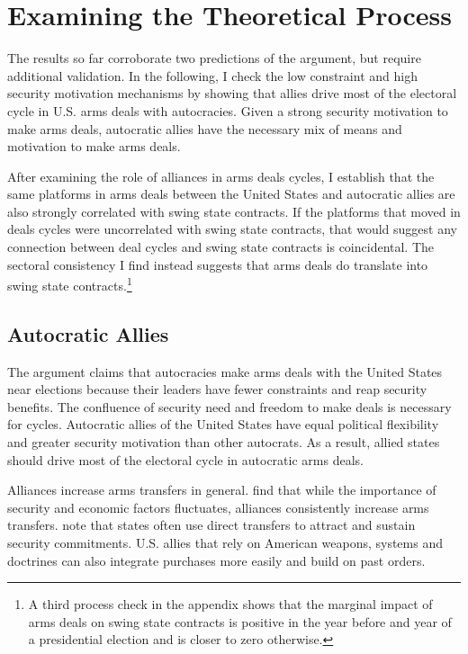 \documentclass[12pt]{article}
\begin{document}
\section{Examining the Theoretical Process}


The results so far corroborate two predictions of the argument, but require additional validation. 
In the following, I check the low constraint and high security motivation mechanisms by showing that allies drive most of the electoral cycle in U.S. arms deals with autocracies.  
Given a strong security motivation to make arms deals, autocratic allies have the necessary mix of means and motivation to make arms deals.


After examining the role of alliances in arms deals cycles, I establish that the same platforms in arms deals between the United States and autocratic allies are also strongly correlated with swing state contracts.
If the platforms that moved in deals cycles were uncorrelated with swing state contracts, that would suggest any connection between deal cycles and swing state contracts is coincidental.
The sectoral consistency I find instead suggests that arms deals do translate into swing state contracts.\footnote{A third process check in the appendix shows that the marginal impact of arms deals on swing state contracts is positive in the year before and year of a presidential election and is closer to zero otherwise.}



\subsection{Autocratic Allies}


The argument claims that autocracies make arms deals with the United States near elections because their leaders have fewer constraints and reap security benefits. 
The confluence of security need and freedom to make deals is necessary for cycles. 
Autocratic allies of the United States have equal political flexibility and greater security motivation than other autocrats. 
As a result, allied states should drive most of the electoral cycle in autocratic arms deals.


Alliances increase arms transfers in general. 
\citet{Thurneretal2019} find that while the importance of security and economic factors fluctuates, alliances consistently increase arms transfers.
\citet[pg. 184-5]{IkenberryGrieco2003} note that states often use direct transfers to attract and sustain security commitments. 
U.S. allies that rely on American weapons, systems and doctrines can also integrate purchases more easily and build on past orders. 
\end{document}
